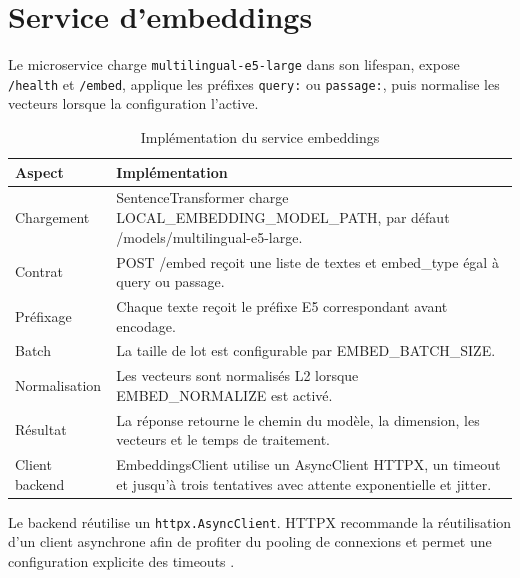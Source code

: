 \section{Service d'embeddings}
Le microservice charge \texttt{multilingual-e5-large} dans son lifespan, expose \texttt{/health} et \texttt{/embed}, applique les préfixes \texttt{query:} ou \texttt{passage:}, puis normalise les vecteurs lorsque la configuration l'active.

\begin{table}[H]
\centering
\caption{Implémentation du service embeddings}
\label{tab:embed_ch6}
\begin{tabular}{p{3.4cm}p{9.8cm}}
\toprule
\textbf{Aspect} & \textbf{Implémentation} \\
\midrule
Chargement & SentenceTransformer charge LOCAL\_EMBEDDING\_MODEL\_PATH, par défaut /models/multilingual-e5-large. \\
Contrat & POST /embed reçoit une liste de textes et embed\_type égal à query ou passage. \\
Préfixage & Chaque texte reçoit le préfixe E5 correspondant avant encodage. \\
Batch & La taille de lot est configurable par EMBED\_BATCH\_SIZE. \\
Normalisation & Les vecteurs sont normalisés L2 lorsque EMBED\_NORMALIZE est activé. \\
Résultat & La réponse retourne le chemin du modèle, la dimension, les vecteurs et le temps de traitement. \\
Client backend & EmbeddingsClient utilise un AsyncClient HTTPX, un timeout et jusqu’à trois tentatives avec attente exponentielle et jitter. \\
\bottomrule
\end{tabular}
\end{table}

Le backend réutilise un \texttt{httpx.AsyncClient}. HTTPX recommande la réutilisation d'un client asynchrone afin de profiter du pooling de connexions et permet une configuration explicite des timeouts \citep{HTTPXAsync2026,HTTPXTimeouts2026}.

